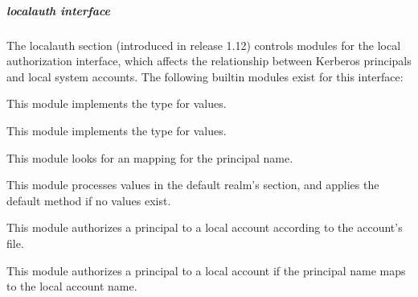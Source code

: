 \documentclass[letterpaper,10pt,english]{sphinxmanual}
\begin{document}
\subparagraph{localauth interface}
\label{\detokenize{admin/conf_files/krb5_conf:localauth-interface}}\label{\detokenize{admin/conf_files/krb5_conf:localauth}}
\sphinxAtStartPar
The localauth section (introduced in release 1.12) controls modules
for the local authorization interface, which affects the relationship
between Kerberos principals and local system accounts.  The following
built\sphinxhyphen{}in modules exist for this interface:
\begin{description}
\sphinxAtStartPar
This module implements the  type for 
values.

\sphinxAtStartPar
This module implements the  type for 
values.

\sphinxAtStartPar
This module looks for an  mapping for the
principal name.

\sphinxAtStartPar
This module processes  values in the default
realm’s section, and applies the default method if no
 values exist.

\sphinxAtStartPar
This module authorizes a principal to a local account according to
the account’s  file.

\sphinxAtStartPar
This module authorizes a principal to a local account if the
principal name maps to the local account name.

\end{description}
\end{document}
